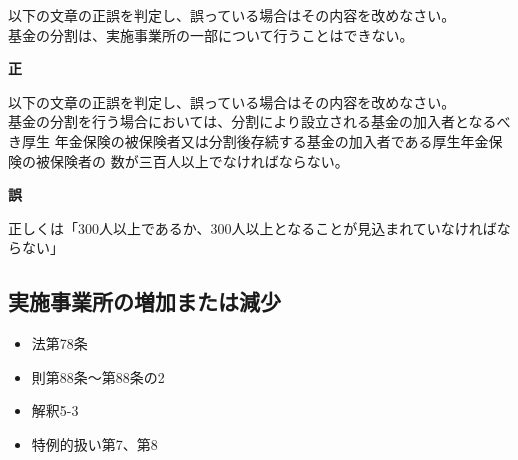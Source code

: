 \begin{truefalse}[年金2 2022 問題1(1)(エ)\ajRoman{2}]
    以下の文章の正誤を判定し、誤っている場合はその内容を改めなさい。
\\

  基金の分割は、実施事業所の一部について行うことはできない。
\end{truefalse}

\begin{answerbox}
  \textbf{正}
\end{answerbox}


\begin{truefalse}[年金2 2022 問題1(1)(エ)\ajRoman{3}]
    以下の文章の正誤を判定し、誤っている場合はその内容を改めなさい。
\\

  基金の分割を行う場合においては、分割により設立される基金の加入者となるべき厚生
年金保険の被保険者又は分割後存続する基金の加入者である厚生年金保険の被保険者の
数が三百人以上でなければならない。
\end{truefalse}


\begin{answerbox}
  \textbf{誤}

正しくは「300人以上であるか、300人以上となることが見込まれていなければならない」  
\end{answerbox}

\newpage

\subsection{実施事業所の増加または減少}


\begin{InyouJobunbox}
  \begin{itemize}
    \item 法第78条
    \item 則第88条〜第88条の2
    \item 解釈5-3
    \item 特例的扱い第7、第8
  \end{itemize}
\end{InyouJobunbox}

